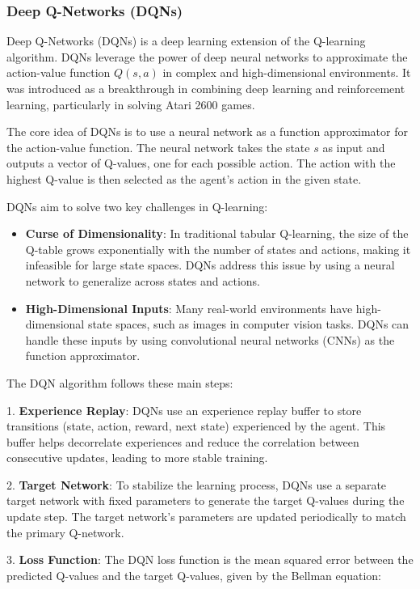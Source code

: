 \subsubsection{Deep Q-Networks (DQNs)}
Deep Q-Networks (DQNs) is a deep learning extension of the Q-learning algorithm. DQNs leverage the power of deep neural networks to approximate the action-value function \(Q(s, a)\) in complex and high-dimensional environments. It was introduced as a breakthrough in combining deep learning and reinforcement learning, particularly in solving Atari 2600 games.

The core idea of DQNs is to use a neural network as a function approximator for the action-value function. The neural network takes the state \(s\) as input and outputs a vector of Q-values, one for each possible action. The action with the highest Q-value is then selected as the agent's action in the given state.

DQNs aim to solve two key challenges in Q-learning:
\begin{itemize}
    \item \textbf{Curse of Dimensionality}: In traditional tabular Q-learning, the size of the Q-table grows exponentially with the number of states and actions, making it infeasible for large state spaces. DQNs address this issue by using a neural network to generalize across states and actions.
    \item \textbf{High-Dimensional Inputs}: Many real-world environments have high-dimensional state spaces, such as images in computer vision tasks. DQNs can handle these inputs by using convolutional neural networks (CNNs) as the function approximator.
\end{itemize}

The DQN algorithm follows these main steps:

1.
\textbf{Experience Replay}: DQNs use an experience replay buffer to store transitions (state, action, reward, next state) experienced by the agent. This buffer helps decorrelate experiences and reduce the correlation between consecutive updates, leading to more stable training.

2.
\textbf{Target Network}: To stabilize the learning process, DQNs use a separate target network with fixed parameters to generate the target Q-values during the update step. The target network's parameters are updated periodically to match the primary Q-network.

3.
\textbf{Loss Function}: The DQN loss function is the mean squared error between the predicted Q-values and the target Q-values, given by the Bellman equation:

